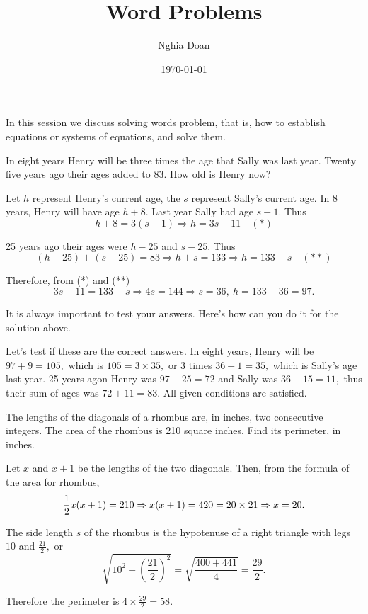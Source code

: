 \documentclass{article}
\title{Word Problems}
\author{Nghia Doan}
\date{\today}
\begin{document}
\maketitle

In this session we discuss solving words problem, that is, how to establish equations or systems of equations, and solve them.

\begin{example}
    In eight years Henry will be three times the age that Sally was last year. Twenty five years ago their ages added to 83. How old is Henry now?
\end{example}

\begin{soln}
    Let $h$ represent Henry's current age, the $s$ represent Sally's current age. In 8 years, Henry will have age $h+8.$
    Last year Sally had age $s-1.$ Thus 
    \[
        h+8 = 3(s-1) \Rightarrow h = 3s -11 \quad (*)
    \]

    25 years ago their ages were $h-25$ and $s-25.$ Thus
    \[
        (h-25) + (s-25) = 83 \Rightarrow h + s = 133 \Rightarrow h = 133 - s \quad (**)
    \]

    Therefore, from (*) and (**)
    \[
        3s - 11 = 133 - s \Rightarrow 4s = 144 \Rightarrow s = 36,\ h = 133-36 = \boxed{97.}
    \]
\end{soln}

\begin{remark*}
    It is always important to test your answers. Here's how can you do it for the solution above.

    Let's test if these are the correct answers. In eight years, Henry will be $97 + 9 =105,$ which is $105 = 3\times 35,$ or 3 times $36-1=35,$
    which is Sally's age last year. 25 years agon Henry was $97-25=72$ and Sally was $36-15=11,$ thus their sum of ages was $72+11=83.$
    All given conditions are satisfied.
\end{remark*}

\begin{example}
    The lengths of the diagonals of a rhombus are, in inches, two consecutive integers.
    The area of the rhombus is 210 square inches. Find its perimeter, in inches.
\end{example}

\begin{soln}
    Let $x$ and $x+1$ be the lengths of the two diagonals. Then, from the formula of the area for rhombus,
    \[
        \frac{1}{2} x(x+1) = 210 \Rightarrow x(x+1) = 420 = 20 \times 21 \Rightarrow x = 20.
    \]

    The side length $s$ of the rhombus is the hypotenuse of a right triangle with legs $10$ and $\frac{21}{2},$
    or
    \[
        \sqrt{10^2 + \left(\frac{21}{2}\right)^2 } = \sqrt{\frac{400 + 441}{4}} = \frac{29}{2}.
    \]

    Therefore the perimeter is $4 \times \frac{29}{2} = \boxed{58}.$
\end{soln}
\end{document}
